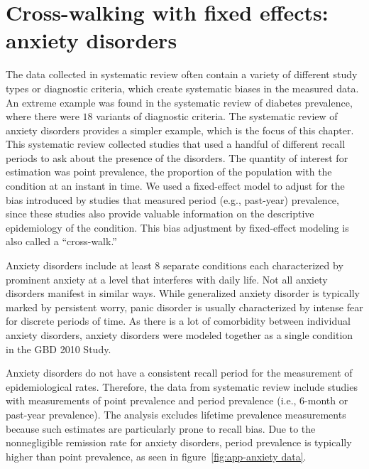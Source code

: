\chapter{Cross-walking with fixed effects: anxiety disorders}
\label{applications-efx_study_level}

The data collected in systematic review often contain a variety of
different study types or diagnostic criteria, which create systematic
biases in the measured data.  An extreme example was found in the
systematic review of diabetes prevalence, where there were $18$ variants
of diagnostic criteria.  The systematic review of anxiety disorders
provides a simpler example, which is the focus of this chapter. This
systematic review collected studies that used a handful of different
recall periods to ask about the presence of the disorders. The quantity
of interest for estimation was point prevalence, the
proportion of the population with the condition at an instant in time.
We used a fixed-effect model to adjust for the bias introduced by
studies that measured period (e.g., past-year) prevalence, since these studies also provide
valuable information on the descriptive epidemiology of the condition.
This bias adjustment by fixed-effect modeling is also called a
``cross-walk.''

Anxiety disorders include at least $8$ separate conditions each
characterized by prominent anxiety at a level that interferes with
daily life.  Not all anxiety disorders manifest in similar ways.
While generalized anxiety disorder is typically marked by persistent
worry, panic disorder is usually characterized by intense fear for
discrete periods of time. \cite{american_psychiatric_association_diagnostic_2000} As there is
a lot of comorbidity between individual anxiety disorders, anxiety
disorders were modeled together as a single condition in the GBD 2010
Study.

Anxiety disorders do not have a consistent recall period for the
measurement of epidemiological rates.  Therefore, the data from
systematic review include studies with measurements of point prevalence
and period prevalence (i.e., $6$-month or past-year prevalence).  The
analysis excludes lifetime prevalence measurements because such estimates
are particularly prone to recall bias.  Due to the nonnegligible
remission rate for anxiety disorders, period prevalence is typically
higher than point prevalence, as seen in figure~\ref{fig:app-anxiety
  data}.

